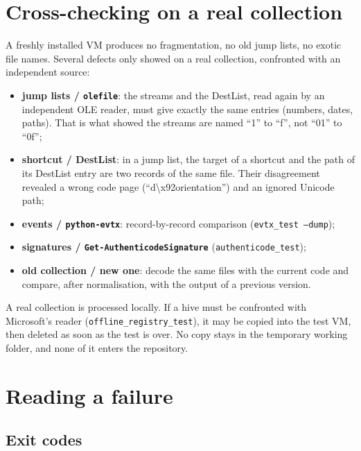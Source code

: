 \documentclass[11pt,a4paper,oneside]{report}
\begin{document}
\chapter{Cross-checking on a real collection}

A freshly installed VM produces no fragmentation, no old jump lists, no exotic
file names. Several defects only showed on a real collection, confronted with an
independent source:

\begin{itemize}
  \item \textbf{jump lists / \texttt{olefile}}: the streams and the DestList,
    read again by an independent OLE reader, must give exactly the same entries
    (numbers, dates, paths). That is what showed the streams are named ``1'' to
    ``f'', not ``01'' to ``0f'';
  \item \textbf{shortcut / DestList}: in a jump list, the target of a shortcut
    and the path of its DestList entry are two records of the same file. Their
    disagreement revealed a wrong code page (``d\textbackslash x92orientation'')
    and an ignored Unicode path;
  \item \textbf{events / \texttt{python-evtx}}: record-by-record comparison
    (\texttt{evtx\_test --dump});
  \item \textbf{signatures / \texttt{Get-AuthenticodeSignature}}
    (\texttt{authenticode\_test});
  \item \textbf{old collection / new one}: decode the same files with the
    current code and compare, after normalisation, with the output of a
    previous version.
\end{itemize}

\begin{attention}
A real collection is processed locally. If a hive must be confronted with
Microsoft's reader (\texttt{offline\_registry\_test}), it may be copied into
the test VM, then deleted as soon as the test is over. No copy stays in the temporary working folder, and none of it
enters the repository.
\end{attention}

\chapter{Reading a failure}

\section{Exit codes}
\end{document}
